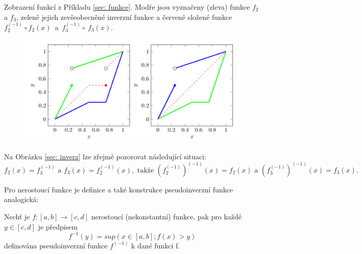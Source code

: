 \begin{graph} Zobrazení funkcí z Příkladu \ref{sec: funkce}. Modře jsou vyznačeny (zleva) funkce $f_2$ a $f_3$, zeleně jejich zevšeobecněné inverzní funkce a červeně složené funkce $f_2^{(-1)} \circ f_2(x) $~a~$ f_3^{(-1)}\circ ~f_3(x).$
\label{sec: inverz}
     \begin{figure}[H]
                \hspace{-1cm}
                \includegraphics[scale=0.65]{template-fig/zevs_inverz.pdf}
                \centering
            \end{figure}

            
\end{graph}

Na Obrázku \ref{sec: inverz} lze zřejmě pozorovat následující situaci: $$f_2(x)=f_3^{(-1)}\text{ a } f_3(x)=f_2^{(-1)}(x), \text{ takže } (f_2^{(-1)})^{(-1)}(x)=f_2(x) \text{ a }
            (f_3^{(-1)})^{(-1)}(x)=f_3(x).$$ 
            
 Pro nerostouc\'i funkce je definice a tak\'e konstrukce pseudoinverzn\'i funkce analogick\'a: 
\begin{definition}
    \cite{hlinena}
    Nech\v t je $f:[a,b] \rightarrow [c,d]$ nerostoucí (nekonstantní) funkce, pak pro každé $y \in [c,d]$ je předpisem $$f^{-1}(y) = sup(x \in [a,b];f(x)>y)$$
    definována pseudoinverzní funkce $f^{(-1)}$ k dané funkci f.
\end{definition}


